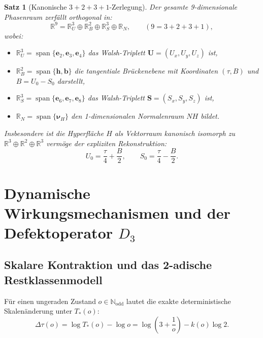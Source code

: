 \documentclass[11pt,a4paper]{article}
\theoremstyle{plain}
\newtheorem{theorem}{Satz}[section]
\theoremstyle{definition}
\newcommand{\N}{\mathbb{N}}
\newcommand{\R}{\mathbb{R}}
\begin{document}
\begin{theorem}[Kanonische $3+2+3+1$-Zerlegung]
\label{thm:decomp3231}
Der gesamte 9-dimensionale Phasenraum zerfällt orthogonal in:
\begin{equation}
    \R^9 = \mathbb{R}^3_U \oplus \mathbb{R}^2_B \oplus \mathbb{R}^3_S \oplus \mathbb{R}_N, \qquad (9 = 3 + 2 + 3 + 1),
\end{equation}
wobei:
\begin{itemize}
    \item $\mathbb{R}^3_U = \operatorname{span}\{\mathbf{e}_2, \mathbf{e}_3, \mathbf{e}_4\}$ das Walsh-Triplett $\mathbf{U} = (U_x, U_y, U_z)$ ist,
    \item $\mathbb{R}^2_B = \operatorname{span}\{\mathbf{h}, \mathbf{b}\}$ die tangentiale Brückenebene mit Koordinaten $(\tau, B)$ und $B = U_0 - S_0$ darstellt,
    \item $\mathbb{R}^3_S = \operatorname{span}\{\mathbf{e}_6, \mathbf{e}_7, \mathbf{e}_8\}$ das Walsh-Triplett $\mathbf{S} = (S_x, S_y, S_z)$ ist,
    \item $\mathbb{R}_N = \operatorname{span}\{\boldsymbol{\nu}_H\}$ den 1-dimensionalen Normalenraum $NH$ bildet.
\end{itemize}
Insbesondere ist die Hyperfläche $H$ als Vektorraum kanonisch isomorph zu $\R^3 \oplus \R^2 \oplus \R^3$ vermöge der expliziten Rekonstruktion:
\begin{equation}
    U_0 = \frac{\tau}{4} + \frac{B}{2}, \qquad S_0 = \frac{\tau}{4} - \frac{B}{2}.
\end{equation}
\end{theorem}

\section{Dynamische Wirkungsmechanismen und der Defektoperator \texorpdfstring{$D_3$}{D3}}

\subsection{Skalare Kontraktion und das 2-adische Restklassenmodell}

Für einen ungeraden Zustand $o \in \N_{\mathrm{odd}}$ lautet die exakte deterministische Skalenänderung unter $T_*(o)$:
\begin{equation}
    \Delta\tau(o) = \log T_*(o) - \log o = \log\left(3 + \frac{1}{o}\right) - k(o)\log 2.
\end{equation}
\end{document}
